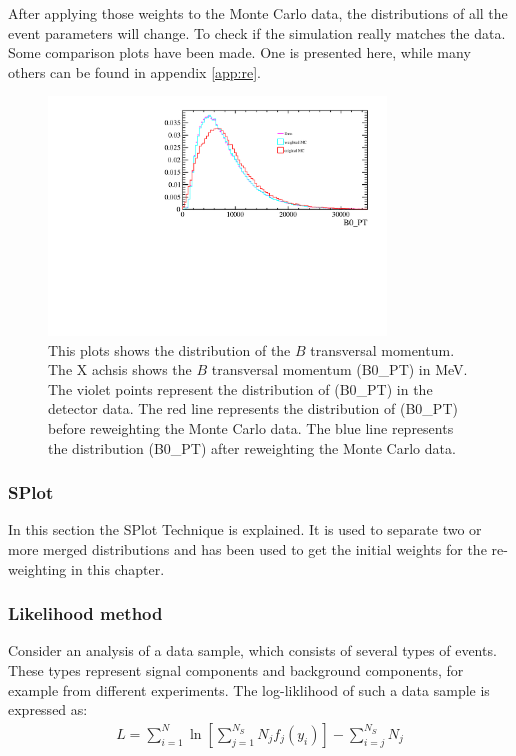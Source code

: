 \documentclass[english]{uzhpub}
\begin{document}
After applying those weights to the Monte Carlo data, the distributions of all the event parameters will change. To check if the simulation really matches the data. Some comparison plots have been made. One is presented here, while many others can be found in appendix \ref{app:re}.

\begin{figure}[H]
\centering
\includegraphics[width=0.8\textwidth]{Reweighting/B0_PT}
\caption{This plots shows the distribution of the $B$ transversal momentum. The X achsis shows the $B$ transversal momentum (B0\_PT) in MeV. The violet points represent the distribution of (B0\_PT) in the detector data.
The red line represents the distribution of (B0\_PT) before reweighting the Monte Carlo data.
The blue line represents the distribution (B0\_PT) after reweighting the Monte Carlo data. }
\label{fig:B0_PT}
\end{figure}




 \subsubsection{SPlot}
In this section the SPlot Technique is explained. It is used to separate two or more merged distributions and  has been used to get the initial weights for the re-weighting in this chapter.

 \subsubsection*{Likelihood method}
 Consider an analysis of a data sample, which consists of several types of events. These types represent signal components and background components, for example from different experiments. The log-liklihood of such a data sample is expressed as:
 \begin{align}
  L = \sum_{i=1}^{N} \ln \left[ \sum_{j=1}^{N_S} N_j f_j (y_i) \right] - \sum_{i=j}^{N_S} N_j \label{eq:L}
 \end{align}
\end{document}
